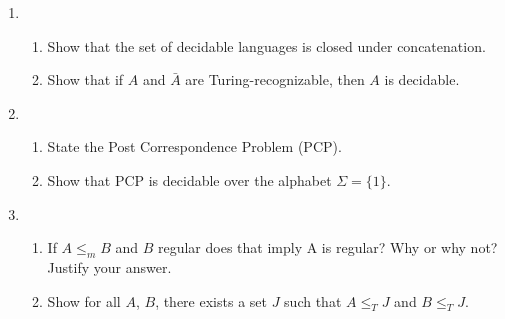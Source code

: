 \documentclass[11pt]{article}
\begin{document}
\begin{enumerate}
\begin{enumerate}
\end{enumerate}
\item
\begin{enumerate}
	\item Show that the set of decidable languages is closed under concatenation.
	\item Show that if $A$ and $\bar{A}$ are Turing-recognizable, then $A$ is decidable.

\end{enumerate} 
\item 
\begin{enumerate}
	\item State the Post Correspondence Problem (PCP).
	\item Show that PCP is decidable over the alphabet $\Sigma = \{1\}$.
\end{enumerate}

\item 
\begin{enumerate}
	\item If $A\leq_m B$ and $B$ regular does that imply A is regular?  Why or why not?
		Justify your answer.
	\item Show for all $A$, $B$, there exists a set  $J$ such that 
		$A\leq_T J$ and $B\leq_T J$.
\end{enumerate}

\end{enumerate}
\end{document}
